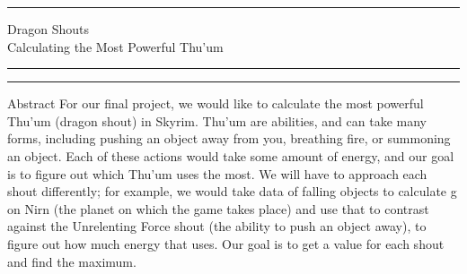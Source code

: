 \documentclass{article}
\begin{document}
	\hrule
	\begin{center}
		\large {Dragon Shouts}\\ \large{Calculating the Most Powerful Thu'um}
	\end{center}
	\hrule
	\vspace{1pt}
	\hrule height 1pt

	\begin{section}{Abstract}
		For our final project, we would like to calculate the most powerful Thu'um (dragon shout) in Skyrim. Thu'um are abilities, and can take many forms, including pushing an object away from you, breathing fire, or summoning an object. Each of these actions would take some amount of energy, and our goal is to figure out which Thu'um uses the most. We will have to approach each shout differently; for example, we would take data of falling objects to calculate g on Nirn (the planet on which the game takes place) and use that to contrast against the Unrelenting Force shout (the ability to push an object away), to figure out how much energy that uses. Our goal is to get a value for each shout and find the maximum.
	\end{section}
\end{document}
